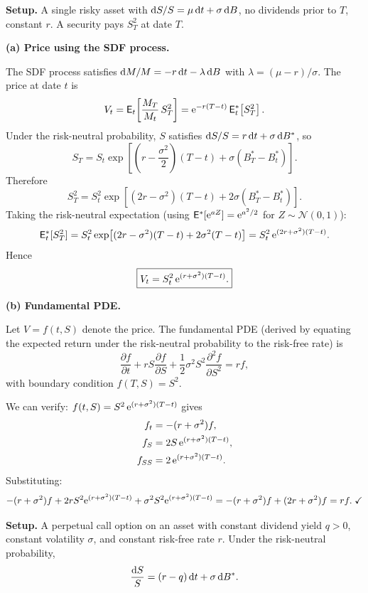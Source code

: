 
\textbf{Setup.}  A single risky asset with $\mathrm{d} S/S = \mu\,\mathrm{d} t + \sigma\,\mathrm{d} B$, no dividends prior to $T$, constant $r$.  A security pays $S_T^2$ at date $T$.

\baselineskip
\textbf{(a) Price using the SDF process.}

The SDF process satisfies $\mathrm{d} M/M = -r\,\mathrm{d} t - \lambda\,\mathrm{d} B$ with $\lambda = (\mu - r)/\sigma$.  The price at date $t$ is
$$V_t = \mathsf{E}_t\!\left[\frac{M_T}{M_t}\,S_T^2\right] = \mathrm{e}^{-r(T-t)}\,\mathsf{E}_t^*\!\left[S_T^2\right].$$
Under the risk-neutral probability, $S$ satisfies $\mathrm{d} S/S = r\,\mathrm{d} t + \sigma\,\mathrm{d} B^*$, so
$$S_T = S_t\exp\!\left[\left(r - \frac{\sigma^2}{2}\right)(T-t) + \sigma(B_T^* - B_t^*)\right].$$
Therefore
$$S_T^2 = S_t^2\exp\!\left[\left(2r - \sigma^2\right)(T-t) + 2\sigma(B_T^* - B_t^*)\right].$$
Taking the risk-neutral expectation (using $\mathsf{E}^*[\mathrm{e}^{aZ}] = \mathrm{e}^{a^2/2}$ for $Z \sim \mathcal{N}(0,1)$):
$$\mathsf{E}_t^*[S_T^2] = S_t^2\exp\!\left[(2r - \sigma^2)(T-t) + 2\sigma^2(T-t)\right] = S_t^2\,\mathrm{e}^{(2r + \sigma^2)(T-t)}.$$
Hence
$$\boxed{V_t = S_t^2\,\mathrm{e}^{(r + \sigma^2)(T-t)}.}$$

\baselineskip
\textbf{(b) Fundamental PDE.}

Let $V = f(t,S)$ denote the price.  The fundamental PDE (derived by equating the expected return under the risk-neutral probability to the risk-free rate) is
$$\frac{\partial f}{\partial t} + rS\frac{\partial f}{\partial S} + \frac{1}{2}\sigma^2 S^2\frac{\partial^2 f}{\partial S^2} = rf,$$
with boundary condition $f(T,S) = S^2$.

We can verify: $f(t,S) = S^2\,\mathrm{e}^{(r+\sigma^2)(T-t)}$ gives
\begin{align*}
f_t &= -(r+\sigma^2)f, \\
f_S &= 2S\,\mathrm{e}^{(r+\sigma^2)(T-t)}, \\
f_{SS} &= 2\,\mathrm{e}^{(r+\sigma^2)(T-t)}.
\end{align*}
Substituting:
$$-(r+\sigma^2)f + 2rS^2\mathrm{e}^{(r+\sigma^2)(T-t)} + \sigma^2 S^2\mathrm{e}^{(r+\sigma^2)(T-t)} = -(r+\sigma^2)f + (2r + \sigma^2)f = rf.\;\checkmark$$


\textbf{Setup.}  A perpetual call option on an asset with constant dividend yield $q > 0$, constant volatility $\sigma$, and constant risk-free rate $r$.  Under the risk-neutral probability,
$$\frac{\mathrm{d} S}{S} = (r - q)\,\mathrm{d} t + \sigma\,\mathrm{d} B^*.$$

